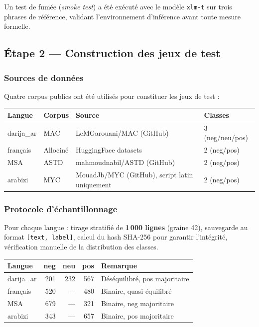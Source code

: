 \documentclass[12pt, a4paper]{article}
\begin{document}
Un test de fumée (\textit{smoke test}) a été exécuté avec le modèle
\texttt{xlm-t} sur trois phrases de référence, validant l'environnement
d'inférence avant toute mesure formelle.

\subsection{Étape 2 — Construction des jeux de test}

\subsubsection{Sources de données}

Quatre corpus publics ont été utilisés pour constituer les jeux de test :

\begin{center}
\begin{tabularx}{\textwidth}{llXl}
\toprule
\textbf{Langue} & \textbf{Corpus} & \textbf{Source} & \textbf{Classes} \\
\midrule
darija\_ar & MAC & LeMGarouani/MAC (GitHub) & 3 (neg/neu/pos) \\
français & Allociné & HuggingFace datasets & 2 (neg/pos) \\
MSA & ASTD & mahmoudnabil/ASTD (GitHub) & 2 (neg/pos) \\
arabizi & MYC & MouadJb/MYC (GitHub), script latin uniquement & 2 (neg/pos) \\
\bottomrule
\end{tabularx}
\end{center}

\subsubsection{Protocole d'échantillonnage}

Pour chaque langue : tirage stratifié de \textbf{1\,000 lignes} (graine 42),
sauvegarde au format \texttt{[text, label]}, calcul du hash SHA-256 pour
garantir l'intégrité, vérification manuelle de la distribution des classes.

\begin{center}
\begin{tabular}{lrrrl}
\toprule
\textbf{Langue} & \textbf{neg} & \textbf{neu} & \textbf{pos} & \textbf{Remarque} \\
\midrule
darija\_ar & 201 & 232 & 567 & Déséquilibré, pos majoritaire \\
français   & 520 &  —  & 480 & Binaire, quasi-équilibré \\
MSA        & 679 &  —  & 321 & Binaire, neg majoritaire \\
arabizi    & 343 &  —  & 657 & Binaire, pos majoritaire \\
\bottomrule
\end{tabular}
\end{center}
\end{document}
